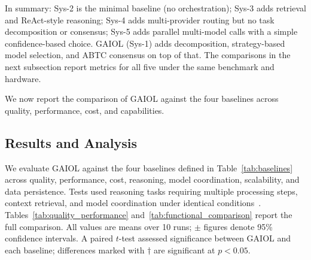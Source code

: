 \documentclass{iopjournal}
\begin{document}
In summary: Sys-2 is the minimal baseline (no orchestration); Sys-3 adds retrieval and ReAct-style reasoning; Sys-4 adds multi-provider routing but no task decomposition or consensus; Sys-5 adds parallel multi-model calls with a simple confidence-based choice. GAIOL (Sys-1) adds decomposition, strategy-based model selection, and ABTC consensus on top of that. The comparisons in the next subsection report metrics for all five under the same benchmark and hardware.

We now report the comparison of GAIOL against the four baselines across quality, performance, cost, and capabilities.

\subsection{Results and Analysis}

We evaluate GAIOL against the four baselines defined in Table~\ref{tab:baselines} across quality, performance, cost, reasoning, model coordination, scalability, and data persistence. Tests used reasoning tasks requiring multiple processing steps, context retrieval, and model coordination under identical conditions~\cite{HolisticEval}. Tables~\ref{tab:quality_performance} and~\ref{tab:functional_comparison} report the full comparison. All values are means over 10 runs; $\pm$ figures denote 95\% confidence intervals. A paired $t$-test assessed significance between GAIOL and each baseline; differences marked with $\dagger$ are significant at $p < 0.05$.
\end{document}

